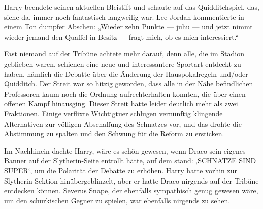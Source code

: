 Harry beendete seinen aktuellen Bleistift und schaute auf das Quidditchspiel, das, siehe da, immer noch fantastisch langweilig war. Lee Jordan kommentierte in einem Ton dumpfer Abscheu:
„Wieder zehn Punkte — juhu — und jetzt nimmt wieder jemand den Quaffel in Besitz — fragt mich, ob es mich interessiert.“

Fast niemand auf der Tribüne achtete mehr darauf, denn alle, die im Stadion geblieben waren, schienen eine neue und interessantere Sportart entdeckt zu haben, nämlich die Debatte über die Änderung der Hauspokalregeln und/oder Quidditch. Der Streit war so hitzig geworden, dass alle in der Nähe befindlichen Professoren kaum noch die Ordnung aufrechterhalten konnten, die über einen offenen Kampf hinausging. Dieser Streit hatte leider deutlich mehr als zwei Fraktionen. Einige verflixte Wichtigtuer schlugen vernünftig klingende Alternativen zur völligen Abschaffung des Schnatzes vor, und das drohte die Abstimmung zu spalten und den Schwung für die Reform zu ersticken.

Im Nachhinein dachte Harry, wäre es schön gewesen, wenn Draco sein eigenes Banner auf der Slytherin-Seite entrollt hätte, auf dem stand: ‚\uppercase{Schnatze sind super}‘, um die Polarität der Debatte zu erhöhen. Harry hatte vorhin zur Slytherin-Sektion hinübergeblinzelt, aber er hatte Draco nirgends auf der Tribüne entdecken können. Severus Snape, der ebenfalls sympathisch genug gewesen wäre, um den schurkischen Gegner zu spielen, war ebenfalls nirgends zu sehen.

